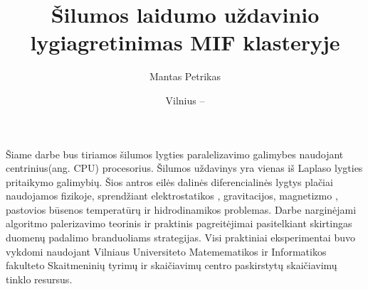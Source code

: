 \documentclass{VUMIFPSbakalaurinis}
\title{Šilumos laidumo uždavinio lygiagretinimas MIF klasteryje}
\author{Mantas Petrikas}
\date{Vilnius – \the\year}
\begin{document}
\maketitle



\tableofcontents





Šiame darbe bus tiriamos šilumos lygties paralelizavimo galimybes naudojant centrinius(ang. CPU) procesorius. 
Šilumos uždavinys yra vienas iš Laplaso lygties pritaikymo galimybių. 
Šios antros eilės dalinės diferencialinės lygtys plačiai naudojamos fizikoje, sprendžiant elektrostatikos \cite{house2008analytic}, gravitacijos, magnetizmo \cite{blakely1996potential}, pastovios būsenos temperatūrų \cite {berntsson2001numerical} ir hidrodinamikos \cite{kadanoff1985simulating} problemas. 
Darbe narginėjami algoritmo palerizavimo teorinis ir praktinis pagreitėjimai pasitelkiant skirtingas duomenų padalimo branduoliams strategijas. 
Visi praktiniai eksperimentai buvo vykdomi naudojant Vilniaus Universiteto Matemematikos ir Informatikos fakulteto Skaitmeninių tyrimų ir skaičiavimų centro paskirstytų skaičiavimų tinklo resursus.


\end{document}
